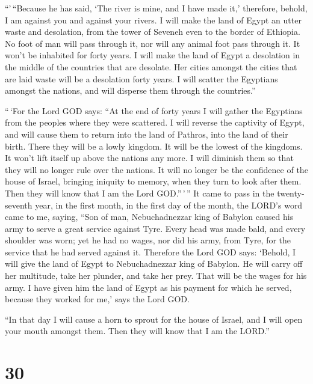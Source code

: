 ``'\,``Because he has said, `The river is mine, and I have made it,'
 therefore, behold, I am against you and against your
rivers. I will make the land of Egypt an utter waste and desolation,
from the tower of Seveneh even to the border of Ethiopia.
 No foot of man will pass through it, nor will any animal
foot pass through it. It won't be inhabited for forty years.
 I will make the land of Egypt a desolation in the middle
of the countries that are desolate. Her cities amongst the cities that
are laid waste will be a desolation forty years. I will scatter the
Egyptians amongst the nations, and will disperse them through the
countries.''

 ``\,`For the Lord GOD says: ``At the end of forty years
I will gather the Egyptians from the peoples where they were scattered.
 I will reverse the captivity of Egypt, and will cause
them to return into the land of Pathros, into the land of their birth.
There they will be a lowly kingdom.  It will be the
lowest of the kingdoms. It won't lift itself up above the nations any
more. I will diminish them so that they will no longer rule over the
nations.  It will no longer be the confidence of the
house of Israel, bringing iniquity to memory, when they turn to look
after them. Then they will know that I am the Lord GOD.''\,'\,''
 It came to pass in the twenty-seventh year, in the first
month, in the first day of the month, the LORD's word came to me,
saying,  ``Son of man, Nebuchadnezzar king of Babylon
caused his army to serve a great service against Tyre. Every head was
made bald, and every shoulder was worn; yet he had no wages, nor did his
army, from Tyre, for the service that he had served against it.
 Therefore the Lord GOD says: `Behold, I will give the
land of Egypt to Nebuchadnezzar king of Babylon. He will carry off her
multitude, take her plunder, and take her prey. That will be the wages
for his army.  I have given him the land of Egypt as his
payment for which he served, because they worked for me,' says the Lord
GOD.

 ``In that day I will cause a horn to sprout for the
house of Israel, and I will open your mouth amongst them. Then they will
know that I am the LORD.''

\hypertarget{section-28}{%
\section{30}\label{section-28}}

